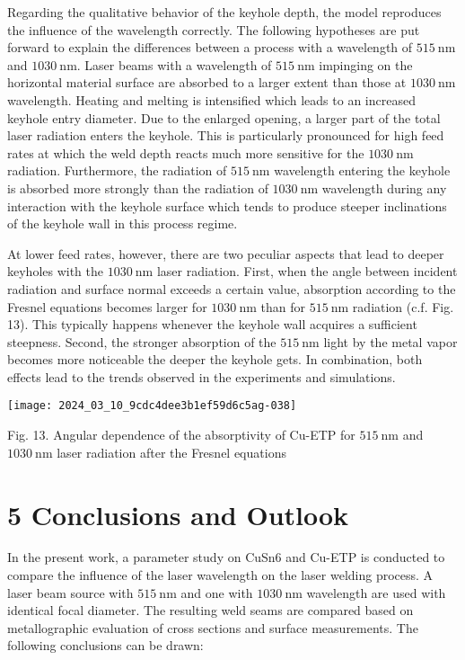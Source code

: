 \documentclass[10pt]{article}
\begin{document}
Regarding the qualitative behavior of the keyhole depth, the model reproduces the influence of the wavelength correctly. The following hypotheses are put forward to explain the differences between a process with a wavelength of $515 \mathrm{~nm}$ and $1030 \mathrm{~nm}$. Laser beams with a wavelength of $515 \mathrm{~nm}$ impinging on the horizontal material surface are absorbed to a larger extent than those at $1030 \mathrm{~nm}$ wavelength. Heating and melting is intensified which leads to an increased keyhole entry diameter. Due to the enlarged opening, a larger part of the total laser radiation enters the keyhole. This is particularly pronounced for high feed rates at which the weld depth reacts much more sensitive for the $1030 \mathrm{~nm}$ radiation. Furthermore, the radiation of $515 \mathrm{~nm}$ wavelength entering the keyhole is absorbed more strongly than the radiation of $1030 \mathrm{~nm}$ wavelength during any interaction with the keyhole surface which tends to produce steeper inclinations of the keyhole wall in this process regime.

At lower feed rates, however, there are two peculiar aspects that lead to deeper keyholes with the $1030 \mathrm{~nm}$ laser radiation. First, when the angle between incident radiation and surface normal exceeds a certain value, absorption according to the Fresnel equations becomes larger for $1030 \mathrm{~nm}$ than for $515 \mathrm{~nm}$ radiation (c.f. Fig. 13). This typically happens whenever the keyhole wall acquires a sufficient steepness. Second, the stronger absorption of the $515 \mathrm{~nm}$ light by the metal vapor becomes more noticeable the deeper the keyhole gets. In combination, both effects lead to the trends observed in the experiments and simulations.

\begin{center}
\texttt{[image: 2024\_03\_10\_9cdc4dee3b1ef59d6c5ag-038]}
\end{center}

Fig. 13. Angular dependence of the absorptivity of Cu-ETP for $515 \mathrm{~nm}$ and $1030 \mathrm{~nm}$ laser radiation after the Fresnel equations

\section*{5 Conclusions and Outlook}
In the present work, a parameter study on CuSn6 and Cu-ETP is conducted to compare the influence of the laser wavelength on the laser welding process. A laser beam source with $515 \mathrm{~nm}$ and one with $1030 \mathrm{~nm}$ wavelength are used with identical focal diameter. The resulting weld seams are compared based on metallographic evaluation of cross sections and surface measurements. The following conclusions can be drawn:
\end{document}
